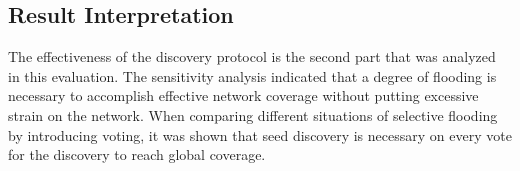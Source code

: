%
%

\subsection{Result Interpretation}

The effectiveness of the discovery protocol is the second part that was analyzed in this evaluation. The sensitivity analysis indicated that a degree of flooding is necessary to accomplish effective network coverage without putting excessive strain on the network. When comparing different situations of selective flooding by introducing voting, it was shown that seed discovery is necessary on every vote for the discovery to reach global coverage.

